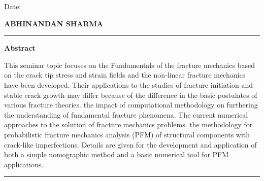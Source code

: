\documentclass[12pt]{article}
\begin{document}
{    \begin{minipage}[t]{7cm}\bf
        \flushleft

        Date:\\
        \end{minipage}
        \hfill
        \begin{minipage}[t]{7cm}\bf
        \flushright
            ABHINANDAN SHARMA
        \end{minipage}

\pagebreak
}
\tableofcontents
\pagebreak
\listoffigures
\pagebreak
\rule{\textwidth}{.1em}
\begin{center}
\textbf{Abstract}
\end{center}
This seminar topic focuses on the Fundamentals of the fracture mechanics based on the crack tip stress and strain fields and the non-linear fracture mechanics have been developed. Their applications to the studies of fracture initiation and stable crack growth may differ because of the difference in the basic postulates of various fracture theories.
    the impact of computational methodology on furthering the understanding of fundamental fracture phenomena. The current numerical approaches to the solution of fracture mechanics problems.
    the methodology for probabilistic fracture mechanics analysis (PFM) of structural components with crack-like imperfections. Details are given for the development and application of both a simple nomographic method and a basic numerical tool for PFM applications.

    

\rule{\textwidth}{.1em}

\end{document}
